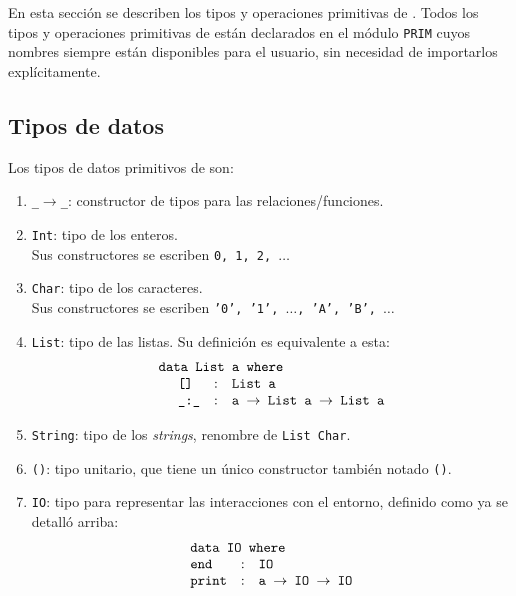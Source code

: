 En esta sección se describen los tipos y operaciones primitivas de \nuflo.
Todos los tipos y operaciones primitivas de \nuflo están declarados en
el módulo \texttt{PRIM} cuyos nombres siempre están disponibles para el
usuario, sin necesidad de importarlos explícitamente.

\subsection{Tipos de datos}
Los tipos de datos primitivos de \nuflo son:

\begin{enumerate}
  \item \texttt{\_$\rightarrow$\_}: constructor de tipos para las relaciones/funciones.
  \item \texttt{Int}: tipo de los enteros. \\ Sus constructores se escriben \texttt{0, 1, 2, $\hdots$}
  \item \texttt{Char}: tipo de los caracteres. \\
        Sus constructores se escriben \texttt{'0', '1', $\hdots$, 'A', 'B', $\hdots$}
  \item \texttt{List}: tipo de las listas. Su definición es equivalente a esta:
  $$
  \begin{array}{l@{\hspace{-3cm}}llll}
    \texttt{data List a where} \\
                       &        & \texttt{[]}    & : & \texttt{List a} \\
                       &        & \texttt{\_:\_} & : & \texttt{a $\rightarrow$ List a $\rightarrow$ List a} \\
  \end{array}
  $$
  \item \texttt{String}: tipo de los {\em strings}, renombre de \texttt{List Char}.
  \item \texttt{()}: tipo unitario, que tiene un único constructor también notado \texttt{()}.
  \item \texttt{IO}: tipo para representar las interacciones con el entorno, definido como
        ya se detalló arriba:
    $$
    \begin{array}{l@{\hspace{-2.75cm}}llll}
      \texttt{data IO where} \\
                         &        & \texttt{end}     & : & \texttt{IO} \\
                         &        & \texttt{print}   & : & \texttt{a $\rightarrow$ IO $\rightarrow$ IO} \\

\end{array}$$
\end{enumerate}
